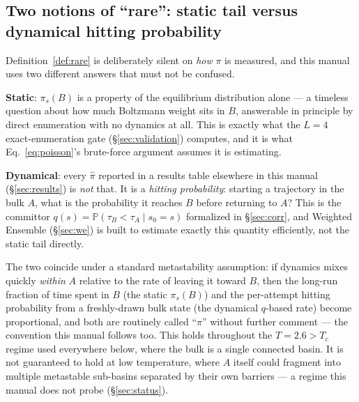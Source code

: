 \documentclass[11pt,a4paper]{article}
\begin{document}
\subsection{Two notions of ``rare'': static tail versus dynamical hitting probability}
Definition~\ref{def:rare} is deliberately silent on \emph{how} $\pi$ is measured, and this manual
uses two different answers that must not be confused.

\textbf{Static}: $\pi_s(B)$ is a property of the equilibrium distribution alone --- a
timeless question about how much Boltzmann weight sits in $B$, answerable in principle by
direct enumeration with no dynamics at all. This is exactly what the $L=4$ exact-enumeration
gate (\S\ref{sec:validation}) computes, and it is what Eq.~\eqref{eq:poisson}'s brute-force
argument assumes it is estimating.

\textbf{Dynamical}: every $\hat\pi$ reported in a results table elsewhere in this manual
(\S\ref{sec:results}) is \emph{not} that. It is a \emph{hitting probability}: starting a
trajectory in the bulk $A$, what is the probability it reaches $B$ before returning to $A$? This
is the committor $q(s)=\mathbb{P}(\tau_B<\tau_A\mid s_0=s)$ formalized in
\S\ref{sec:corr}, and Weighted Ensemble (\S\ref{sec:we}) is built to estimate exactly this
quantity efficiently, not the static tail directly.

The two coincide under a standard metastability assumption: if dynamics mixes quickly
\emph{within} $A$ relative to the rate of leaving it toward $B$, then the long-run fraction of
time spent in $B$ (the static $\pi_s(B)$) and the per-attempt hitting probability from a
freshly-drawn bulk state (the dynamical $q$-based rate) become proportional, and both are
routinely called ``$\pi$'' without further comment --- the convention this manual follows too.
This holds throughout the $T=2.6>T_c$ regime used everywhere below, where the bulk is a single
connected basin. It is not guaranteed to hold at low temperature, where $A$ itself could
fragment into multiple metastable sub-basins separated by their own barriers --- a regime this
manual does not probe (\S\ref{sec:status}).
\end{document}
